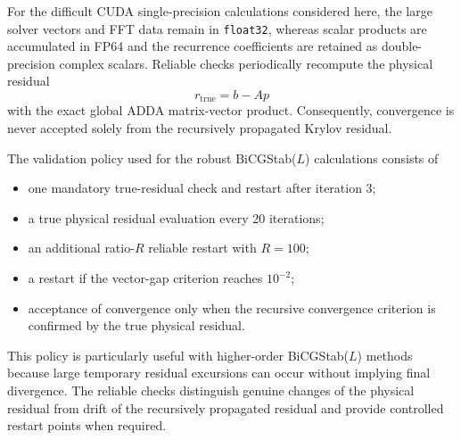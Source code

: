 \documentclass[11pt,a4paper]{article}
\begin{document}
For the difficult CUDA single-precision calculations considered here, the large solver vectors and FFT data remain in \texttt{float32}, whereas scalar products are accumulated in FP64 and the recurrence coefficients are retained as double-precision complex scalars. Reliable checks periodically recompute the physical residual
\begin{equation}
r_{\mathrm{true}}=b-Ap
\end{equation}
with the exact global ADDA matrix-vector product. Consequently, convergence is never accepted solely from the recursively propagated Krylov residual.

The validation policy used for the robust BiCGStab(\(L\)) calculations consists of
\begin{itemize}[leftmargin=1.6em]
\item one mandatory true-residual check and restart after iteration 3;
\item a true physical residual evaluation every 20 iterations;
\item an additional ratio-\(R\) reliable restart with \(R=100\);
\item a restart if the vector-gap criterion reaches \(10^{-2}\);
\item acceptance of convergence only when the recursive convergence criterion is confirmed by the true physical residual.
\end{itemize}

This policy is particularly useful with higher-order BiCGStab(\(L\)) methods because large temporary residual excursions can occur without implying final divergence. The reliable checks distinguish genuine changes of the physical residual from drift of the recursively propagated residual and provide controlled restart points when required.
\end{document}
